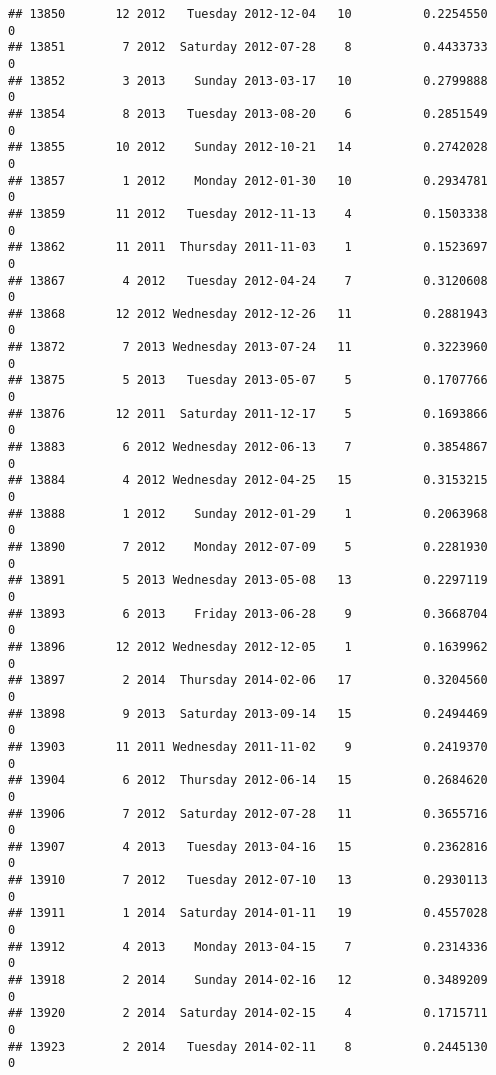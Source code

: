 \documentclass[
]{article}
\begin{document}
\begin{verbatim}
## 13850       12 2012   Tuesday 2012-12-04   10          0.2254550             0
## 13851        7 2012  Saturday 2012-07-28    8          0.4433733             0
## 13852        3 2013    Sunday 2013-03-17   10          0.2799888             0
## 13854        8 2013   Tuesday 2013-08-20    6          0.2851549             0
## 13855       10 2012    Sunday 2012-10-21   14          0.2742028             0
## 13857        1 2012    Monday 2012-01-30   10          0.2934781             0
## 13859       11 2012   Tuesday 2012-11-13    4          0.1503338             0
## 13862       11 2011  Thursday 2011-11-03    1          0.1523697             0
## 13867        4 2012   Tuesday 2012-04-24    7          0.3120608             0
## 13868       12 2012 Wednesday 2012-12-26   11          0.2881943             0
## 13872        7 2013 Wednesday 2013-07-24   11          0.3223960             0
## 13875        5 2013   Tuesday 2013-05-07    5          0.1707766             0
## 13876       12 2011  Saturday 2011-12-17    5          0.1693866             0
## 13883        6 2012 Wednesday 2012-06-13    7          0.3854867             0
## 13884        4 2012 Wednesday 2012-04-25   15          0.3153215             0
## 13888        1 2012    Sunday 2012-01-29    1          0.2063968             0
## 13890        7 2012    Monday 2012-07-09    5          0.2281930             0
## 13891        5 2013 Wednesday 2013-05-08   13          0.2297119             0
## 13893        6 2013    Friday 2013-06-28    9          0.3668704             0
## 13896       12 2012 Wednesday 2012-12-05    1          0.1639962             0
## 13897        2 2014  Thursday 2014-02-06   17          0.3204560             0
## 13898        9 2013  Saturday 2013-09-14   15          0.2494469             0
## 13903       11 2011 Wednesday 2011-11-02    9          0.2419370             0
## 13904        6 2012  Thursday 2012-06-14   15          0.2684620             0
## 13906        7 2012  Saturday 2012-07-28   11          0.3655716             0
## 13907        4 2013   Tuesday 2013-04-16   15          0.2362816             0
## 13910        7 2012   Tuesday 2012-07-10   13          0.2930113             0
## 13911        1 2014  Saturday 2014-01-11   19          0.4557028             0
## 13912        4 2013    Monday 2013-04-15    7          0.2314336             0
## 13918        2 2014    Sunday 2014-02-16   12          0.3489209             0
## 13920        2 2014  Saturday 2014-02-15    4          0.1715711             0
## 13923        2 2014   Tuesday 2014-02-11    8          0.2445130             0

\end{verbatim}
\end{document}
